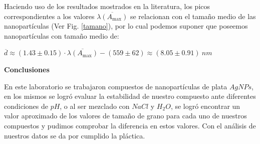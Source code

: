 Haciendo uso de los resultados mostrados en la literatura, los picos correspondientes a los valores $\overline{ \lambda ( A_{\max} )}$ se relacionan con el tamaño medio de las nanopartículas (Ver Fig. \ref{tamano}), por lo cual podemos suponer que poseemos nanopartículas con tamaño medio de:

$\overline{d} \approx  (1.43\pm 0.15)\cdot  \overline{ \lambda ( A_{\max} )} -(559\pm 62)\approx (8.05\pm 0.91)~n m$

\textbf{\textcolor{azul50}{Conclusiones}}

En este laboratorio se trabajaron compuestos de nanopartículas de plata $AgNPs$, en los mismos se logró evaluar la estabilidad de nuestro compuesto ante diferentes condiciones de $pH$, o al ser mezclado con $NaCl$ y $H_2O$, se logró encontrar un valor aproximado de los valores de tamaño de grano para cada uno de nuestros compuestos y pudimos comprobar la diferencia en estos valores. Con el análisis de nuestros datos se da por cumplido la pláctica.





